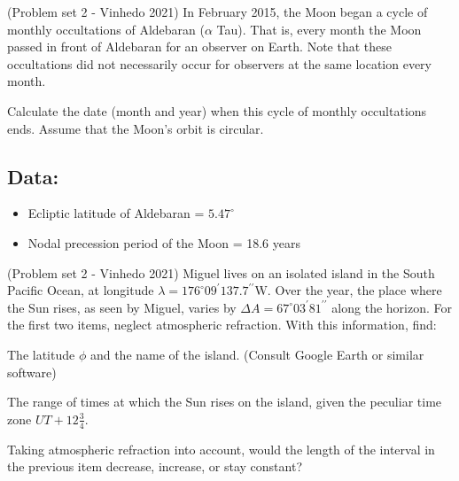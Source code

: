 \documentclass[11pt]{article}
\begin{document}
\begin{pproblem} (Problem set 2 - Vinhedo 2021)
    In February 2015, the Moon began a cycle of monthly occultations of Aldebaran ($\alpha$ Tau). That is, every month the Moon passed in front of Aldebaran for an observer on Earth. Note that these occultations did not necessarily occur for observers at the same location every month. 

    Calculate the date (month and year) when this cycle of monthly occultations ends. Assume that the Moon's orbit is circular.

    \subsection*{Data:}

    \begin{itemize}
        \item Ecliptic latitude of Aldebaran = $5.47^\circ$
        \item Nodal precession period of the Moon = 18.6 years
    \end{itemize}
\end{pproblem}





\begin{pproblem} (Problem set 2 - Vinhedo 2021)
    Miguel lives on an isolated island in the South Pacific Ocean, at longitude
    $\lambda = 176^{\circ}09^{\prime}137.7^{\prime\prime}\text{W}$. Over the year, the place where the Sun rises, as seen by Miguel, varies by $\Delta A = 67^{\circ}03^{\prime}81^{\prime\prime}$ along the horizon. For the first two items, neglect atmospheric refraction. With this information, find:

    \begin{alternativas}
        \item The latitude $\phi$ and the name of the island. (Consult Google Earth or similar software)
        \item The range of times at which the Sun rises on the island, given the peculiar time zone $UT + 12\frac{3}{4}$.
        \item Taking atmospheric refraction into account, would the length of the interval in the previous item decrease, increase, or stay constant?
    \end{alternativas}


\end{pproblem}
\end{document}
